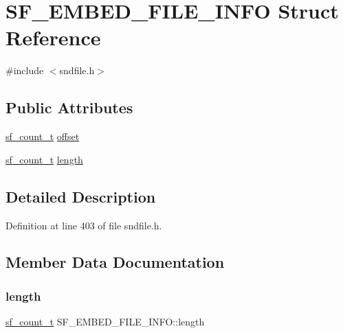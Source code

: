 \hypertarget{struct_s_f___e_m_b_e_d___f_i_l_e___i_n_f_o}{}\section{S\+F\+\_\+\+E\+M\+B\+E\+D\+\_\+\+F\+I\+L\+E\+\_\+\+I\+N\+FO Struct Reference}
\label{struct_s_f___e_m_b_e_d___f_i_l_e___i_n_f_o}


{\ttfamily \#include $<$sndfile.\+h$>$}

\subsection*{Public Attributes}
\begin{DoxyCompactItemize}
\item 
\mbox{\hyperlink{sndfile_8h_af2b12fded74bc949f1f1f392a2af4892}{sf\+\_\+count\+\_\+t}} \mbox{\hyperlink{struct_s_f___e_m_b_e_d___f_i_l_e___i_n_f_o_a3f9c37d1a474485d613276656e31d591}{offset}}
\item 
\mbox{\hyperlink{sndfile_8h_af2b12fded74bc949f1f1f392a2af4892}{sf\+\_\+count\+\_\+t}} \mbox{\hyperlink{struct_s_f___e_m_b_e_d___f_i_l_e___i_n_f_o_a877c809e76ebbec7c45da688ff0109e8}{length}}
\end{DoxyCompactItemize}


\subsection{Detailed Description}


Definition at line 403 of file sndfile.\+h.



\subsection{Member Data Documentation}
\mbox{\label{struct_s_f___e_m_b_e_d___f_i_l_e___i_n_f_o_a877c809e76ebbec7c45da688ff0109e8}} 
\subsubsection{\texorpdfstring{length}{length}}
{\footnotesize\ttfamily \mbox{\hyperlink{sndfile_8h_af2b12fded74bc949f1f1f392a2af4892}{sf\+\_\+count\+\_\+t}} S\+F\+\_\+\+E\+M\+B\+E\+D\+\_\+\+F\+I\+L\+E\+\_\+\+I\+N\+F\+O\+::length}



